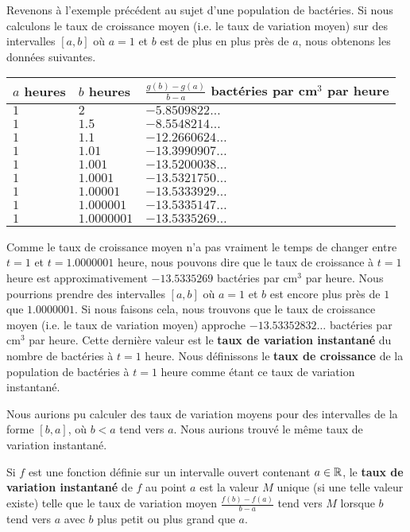 {\begin{egg}
Revenons à l'exemple précédent au sujet d'une population de bactéries.
Si nous calculons le taux de croissance moyen (i.e. le taux de variation
moyen) sur des intervalles $[a,b]$ où $a=1$ et $b$ est de plus en plus
près de $a$, nous obtenons les données suivantes.
\begin{center}
\begin{tabular}{l|l|l}
\hline
$a$ heures & $b$ heures & \rule{0em}{1.3em}
$\frac{g(b)-g(a)}{b-a}$ bactéries par cm$^3$ par heure \\[1ex]
\hline
$1$ & $2$ & $-5.8509822\ldots $ \\
$1$ & $1.5$ & $-8.5548214\ldots$ \\
$1$ & $1.1$ & $-12.2660624\ldots$ \\
$1$ & $1.01$ & $-13.3990907\ldots$ \\
$1$ & $1.001$ & $-13.5200038\ldots$ \\
$1$ & $1.0001$ & $-13.5321750\ldots$ \\
$1$ & $1.00001$ & $-13.5333929\ldots$ \\
$1$ & $1.000001$ & $-13.5335147\ldots$ \\
$1$ & $1.0000001$ & $-13.5335269\ldots$ \\
\hline
\end{tabular}
\end{center}
Comme le taux de croissance moyen n'a pas vraiment le temps de changer
entre $t=1$ et $t=1.0000001$ heure, nous pouvons dire que le taux de
croissance à $t=1$ heure est approximativement $-13.5335269$
bactéries par cm$^3$ par heure.  Nous pourrions prendre des intervalles
$[a,b]$ où $a=1$ et $b$ est encore plus près de $1$ que $1.0000001$.
Si nous faisons cela, nous trouvons que le taux de croissance moyen
(i.e. le taux de variation moyen) approche $-13.53352832\ldots$
bactéries par cm$^3$ par heure.  Cette dernière valeur est le
{\bfseries taux de variation instantané} du nombre de bactéries à
$t=1$ heure.  Nous définissons le {\bfseries taux de croissance} de la
population de bactéries à $t=1$ heure comme étant ce taux de variation
instantané.

Nous aurions pu calculer des taux de variation moyens pour des
intervalles de la forme $[b,a]$, où $b<a$ tend vers $a$.  Nous aurions
trouvé le même taux de variation instantané.
\label{bacter1}
\end{egg}

\begin{defn} 
Si $f$ est une fonction définie sur un intervalle ouvert contenant
$a \in \mathbb{R}$, le {\bfseries taux de variation instantané} de $f$ au
point $a$ est la valeur $M$ unique (si une telle valeur existe) telle
que le taux de variation moyen $\displaystyle \frac{f(b)-f(a)}{b-a}$
tend vers $M$ lorsque $b$ tend vers $a$ avec $b$ plus petit ou
plus grand que $a$.
\end{defn}

}
